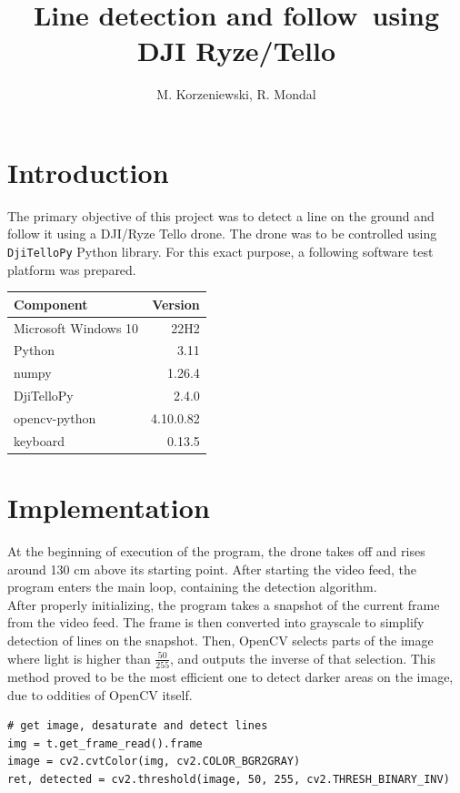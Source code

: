 \documentclass[english,10pt,a4paper,titlepage]{article}
\title{Line detection and follow using DJI Ryze/Tello}
\author{M. Korzeniewski, R. Mondal}
\begin{document}
	\maketitle
	
	\section{Introduction}
	The primary objective of this project was to detect a line on the ground and follow it using a DJI/Ryze Tello drone.  The drone was to be controlled using \verb|DjiTelloPy| Python library. For this exact purpose, a following software test platform was prepared.
	
	\begin{center}
		\begin{tabular}{ | l | r | }
			\hline
			Component & Version \\
			\hline
			Microsoft Windows 10 & 22H2 \\
			Python & 3.11 \\
			numpy & 1.26.4  \\
			DjiTelloPy & 2.4.0 \\
			opencv-python & 4.10.0.82 \\
			keyboard & 0.13.5 \\
			\hline
		\end{tabular}
	\end{center}
	
	\section{Implementation}
	At the beginning of execution of the program, the drone takes off and rises around 130 cm above its starting point. After starting  the video feed, the program enters the main loop, containing the detection algorithm. \\
	
	After properly initializing, the program takes a snapshot of the current frame from the video feed. The frame is then converted into grayscale to simplify detection of lines on the snapshot.  Then, OpenCV selects parts of the image where light is higher than \(\frac{50}{255}\), and outputs the inverse of that selection. This method proved to be the most efficient one to detect darker areas on the image, due to oddities of OpenCV itself.
	
\begin{lstlisting}
# get image, desaturate and detect lines
img = t.get_frame_read().frame
image = cv2.cvtColor(img, cv2.COLOR_BGR2GRAY)
ret, detected = cv2.threshold(image, 50, 255, cv2.THRESH_BINARY_INV)
\end{lstlisting}
	
\end{document}
